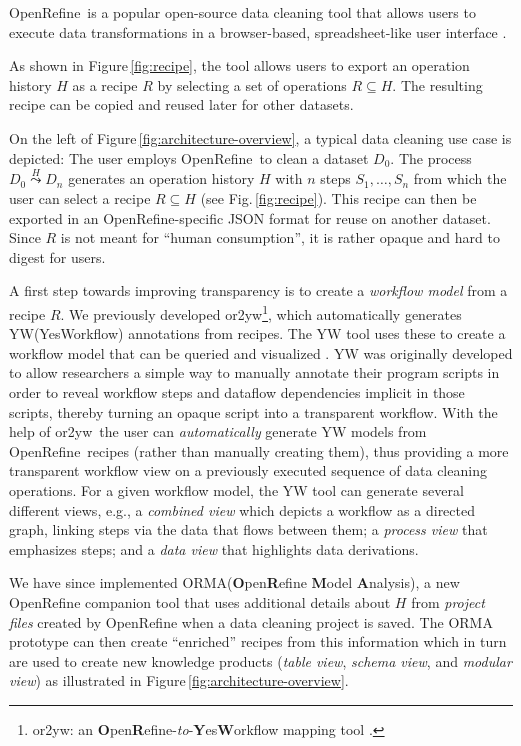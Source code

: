 \documentclass[conference]{ijdc-v14}
\newcommand{\Figref}[1]{Figure\,\ref{#1}}
\newcommand{\figref}[1]{Fig.\,\ref{#1}}
\newcommand{\ortoyw}{\textsf{or2yw}\xspace}
\newcommand{\orma}{\textsf{ORMA}\xspace}  %
\newcommand{\openrefine}{\textrm{OpenRefine}\xspace}
\newcommand{\yw}{\textsf{YW}\xspace}
\begin{document}
\openrefine\ is a popular open-source data cleaning tool that allows users to execute data
transformations in a browser-based, spreadsheet-like user interface \cite{openrefine2020}. 

As shown in
\Figref{fig:recipe}, the tool allows users to export an operation history $H$ as a recipe $R$ by
selecting a set of operations $R\subseteq H$. The resulting recipe can be copied and reused later for other datasets. 


On the left of \Figref{fig:architecture-overview}, a typical data cleaning use case is depicted: The
user employs \openrefine\ to clean a dataset $D_0$. The process $D_0\stackrel{H}{\leadsto}D_n$
generates an operation history $H$ with $n$ steps $S_1,\dots, S_n$ from which the user can select a
recipe $R\subseteq H$ (see \figref{fig:recipe}). This recipe can then be exported in an \openrefine-specific JSON format for
 reuse on another dataset. 
Since $R$ is not meant for ``human consumption'', it is rather opaque and hard to digest for users.

A first step towards improving transparency is to create a \emph{workflow model} from a recipe $R$. We 
previously developed \ortoyw\footnote{\ortoyw: an
  \textbf{O}pen\textbf{R}efine-\emph{to}-\textbf{Y}es\textbf{W}orkflow
  mapping tool \cite{or2yw}.}, which automatically generates \yw (YesWorkflow) annotations from recipes. The \yw tool
uses these to create a workflow model that can be queried and visualized
\cite{mcphillips2015yesworkflow}. \yw was originally developed to allow researchers a simple way to
manually annotate their program scripts in order to reveal workflow steps and dataflow dependencies
implicit in those scripts, thereby turning an opaque script into a transparent workflow. With the
help of \ortoyw\ the user can \emph{automatically} generate \yw models from \openrefine\ recipes
(rather than manually creating them), thus providing a more {transparent workflow view} on a
previously executed sequence of data cleaning operations. For a given workflow model, the \yw tool
can generate several different views,
 e.g., a \emph{combined view} which depicts a workflow as a directed graph, linking steps via the
 data that flows between them; a \emph{process view} that emphasizes steps; and a \emph{data
   view} that highlights data derivations.

 We have since implemented \orma (\textbf{O}pen\textbf{R}efine \textbf{M}odel \textbf{A}nalysis), a
 new \openrefine companion tool that uses additional details about $H$ from \emph{project files}
 created by \openrefine when a data cleaning project is saved. The \orma prototype can then create
 ``enriched'' recipes from this information which in turn are used to create new knowledge products
 (\emph{table view}, \emph{schema view}, and \emph{modular view}) as illustrated in
 \Figref{fig:architecture-overview}.
\end{document}
